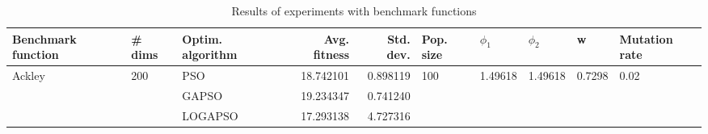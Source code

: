 \begin{table}
\centering
\caption{Results of experiments with benchmark functions}
\begin{tabular}{lllrrlllll}
\toprule
     Benchmark function &              \# dims & Optim. algorithm &  Avg. fitness &  Std. dev. &            Pop. size &               $\phi_{1}$ &               $\phi_{2}$ &                       w &         Mutation rate \\
\midrule
\multirow{3}{*}{Ackley} & \multirow{3}{*}{200} &              PSO &     18.742101 &   0.898119 & \multirow{3}{*}{100} & \multirow{3}{*}{1.49618} & \multirow{3}{*}{1.49618} & \multirow{3}{*}{0.7298} & \multirow{3}{*}{0.02} \\
                        &                      &            GAPSO &     19.234347 &   0.741240 &                      &                          &                          &                         &                       \\
                        &                      &          LOGAPSO &     17.293138 &   4.727316 &                      &                          &                          &                         &                       \\
\bottomrule
\end{tabular}
\end{table}
